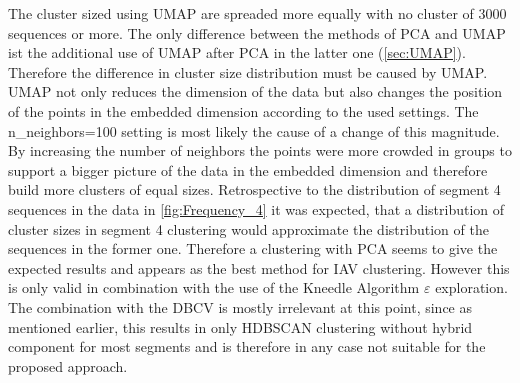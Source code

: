 The cluster sized using \gls{UMAP} are spreaded more equally with no cluster of 3000 sequences or more. The only difference between the methods of \gls{PCA} and \gls{UMAP} ist the additional use of \gls{UMAP} after \gls{PCA} in the latter one (\autoref{sec:UMAP}). Therefore the difference in cluster size distribution must be caused by \gls{UMAP}. \gls{UMAP} not only reduces the dimension of the data but also changes the position of the points in the embedded dimension according to the used settings. The \colorbox{backcolour}{n\_neighbors=100} setting is most likely the cause of a change of this magnitude. By increasing the number of neighbors the points were more crowded in groups to support a bigger picture of the data in the embedded dimension and therefore build more clusters of equal sizes. Retrospective to the distribution of segment 4 sequences in the data in \autoref{fig:Frequency_4} it was expected, that a distribution of cluster sizes in segment 4 clustering would approximate the distribution of the sequences in the former one. Therefore a clustering with \gls{PCA} seems to give the expected results and appears as the best method for \gls{IAV} clustering. However this is only valid in combination with the use of the Kneedle Algorithm $\varepsilon$ exploration. The combination with the \gls{DBCV} is mostly irrelevant at this point, since as mentioned earlier, this results in only \gls{HDBSCAN} clustering without hybrid component for most segments and is therefore in any case not suitable for the proposed approach. 


